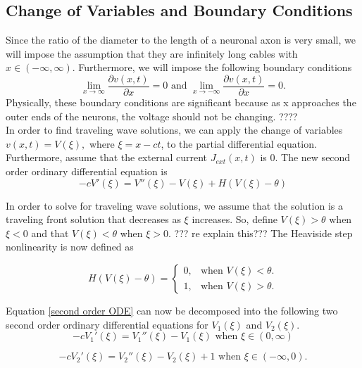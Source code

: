\documentclass[11pt, oneside]{article}   	%
\begin{document}
\subsection{Change of Variables and Boundary Conditions}
Since the ratio of the diameter to the length of a neuronal axon is very small, we will impose the assumption that they are infinitely long cables with $x\in (-\infty,\infty)$. Furthermore, we will impose the following boundary conditions
$$\lim_{x\to\infty} \frac{\partial v(x,t)}{\partial x}=0 \text{ and } \lim_{x\to-\infty} \frac{\partial v(x,t)}{\partial x}=0.$$
Physically, these boundary conditions are significant because as x approaches the outer ends of the neurons, the voltage should not be changing. ???? \\
In order to find traveling wave solutions, we can apply the change of variables $v(x,t)=V(\xi),$ where $\xi=x-ct$, to the partial differential equation. Furthermore, assume that the external current $J_{ext}(x,t)$ is $0$. The new second order ordinary differential equation is 
\begin{equation}
\label{second order ODE}
-cV'(\xi)=V''(\xi)-V(\xi)+H(V(\xi)-\theta)
\end{equation}

In order to solve for traveling wave solutions, we assume that the solution is a traveling front solution that decreases as $\xi$ increases. So, define $V(\xi)>\theta$ when $\xi<0$ and that $V(\xi)<\theta$ when $\xi>0$. ??? re explain this??? The Heaviside step nonlinearity is now defined as 

\begin{equation}
  H(V(\xi)-\theta)=\begin{cases}
    0, & \text{when $V(\xi)<\theta$}.\\
    1, & \text{when $V(\xi)>\theta$}.
  \end{cases}
\end{equation}

Equation \ref{second order ODE} can now be decomposed into the following two second order ordinary differential equations for $V_1(\xi)$ and $V_2(\xi)$.
\begin{equation}
\label{ODE1}
-cV_1'(\xi)=V_1''(\xi)-V_1(\xi) \text{ when  $\xi \in (0,\infty)$}
\end{equation}

\begin{equation}
\label{ODE2} 
-cV_2'(\xi)=V_2''(\xi)-V_2(\xi)+1 \text{ when $\xi \in (-\infty,0)$.}
\end{equation}
\end{document}
